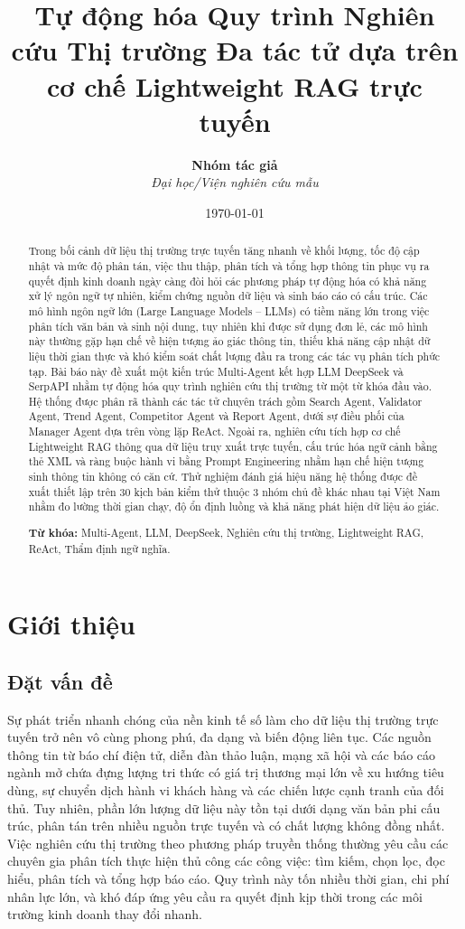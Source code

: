 \documentclass[11pt,a4paper]{article}
\title{\textbf{Tự động hóa Quy trình Nghiên cứu Thị trường Đa tác tử dựa trên cơ chế Lightweight RAG trực tuyến}}
\author{\textbf{Nhóm tác giả} \\
\textit{Đại học/Viện nghiên cứu mẫu}}
\date{\today}
\begin{document}
\maketitle

\begin{abstract}
Trong bối cảnh dữ liệu thị trường trực tuyến tăng nhanh về khối lượng, tốc độ cập nhật và mức độ phân tán, việc thu thập, phân tích và tổng hợp thông tin phục vụ ra quyết định kinh doanh ngày càng đòi hỏi các phương pháp tự động hóa có khả năng xử lý ngôn ngữ tự nhiên, kiểm chứng nguồn dữ liệu và sinh báo cáo có cấu trúc. Các mô hình ngôn ngữ lớn (Large Language Models – LLMs) có tiềm năng lớn trong việc phân tích văn bản và sinh nội dung, tuy nhiên khi được sử dụng đơn lẻ, các mô hình này thường gặp hạn chế về hiện tượng ảo giác thông tin, thiếu khả năng cập nhật dữ liệu thời gian thực và khó kiểm soát chất lượng đầu ra trong các tác vụ phân tích phức tạp. Bài báo này đề xuất một kiến trúc Multi-Agent kết hợp LLM DeepSeek và SerpAPI nhằm tự động hóa quy trình nghiên cứu thị trường từ một từ khóa đầu vào. Hệ thống được phân rã thành các tác tử chuyên trách gồm Search Agent, Validator Agent, Trend Agent, Competitor Agent và Report Agent, dưới sự điều phối của Manager Agent dựa trên vòng lặp ReAct. Ngoài ra, nghiên cứu tích hợp cơ chế Lightweight RAG thông qua dữ liệu truy xuất trực tuyến, cấu trúc hóa ngữ cảnh bằng thẻ XML và ràng buộc hành vi bằng Prompt Engineering nhằm hạn chế hiện tượng sinh thông tin không có căn cứ. Thử nghiệm đánh giá hiệu năng hệ thống được đề xuất thiết lập trên 30 kịch bản kiểm thử thuộc 3 nhóm chủ đề khác nhau tại Việt Nam nhằm đo lường thời gian chạy, độ ổn định luồng và khả năng phát hiện dữ liệu ảo giác.

\textbf{Từ khóa:} Multi-Agent, LLM, DeepSeek, Nghiên cứu thị trường, Lightweight RAG, ReAct, Thẩm định ngữ nghĩa.
\end{abstract}

\section{Giới thiệu}

\subsection{Đặt vấn đề}
Sự phát triển nhanh chóng của nền kinh tế số làm cho dữ liệu thị trường trực tuyến trở nên vô cùng phong phú, đa dạng và biến động liên tục. Các nguồn thông tin từ báo chí điện tử, diễn đàn thảo luận, mạng xã hội và các báo cáo ngành mở chứa đựng lượng tri thức có giá trị thương mại lớn về xu hướng tiêu dùng, sự chuyển dịch hành vi khách hàng và các chiến lược cạnh tranh của đối thủ. Tuy nhiên, phần lớn lượng dữ liệu này tồn tại dưới dạng văn bản phi cấu trúc, phân tán trên nhiều nguồn trực tuyến và có chất lượng không đồng nhất. Việc nghiên cứu thị trường theo phương pháp truyền thống thường yêu cầu các chuyên gia phân tích thực hiện thủ công các công việc: tìm kiếm, chọn lọc, đọc hiểu, phân tích và tổng hợp báo cáo. Quy trình này tốn nhiều thời gian, chi phí nhân lực lớn, và khó đáp ứng yêu cầu ra quyết định kịp thời trong các môi trường kinh doanh thay đổi nhanh.
\end{document}
